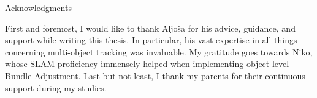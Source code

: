 \thispagestyle{empty}

\vspace*{20mm}

\begin{center}
{ Acknowledgments}
\end{center}

\vspace{10mm}

First and foremost, I would like to thank Aljo\^{s}a for his advice, guidance, and support while writing this thesis.
In particular, his vast expertise in all things concerning multi-object tracking was invaluable.
My gratitude goes towards Niko, whose SLAM proficiency immensely helped when implementing object-level Bundle Adjustment.
Last but not least, I thank my parents for their continuous support during my studies.

\cleardoublepage{}
